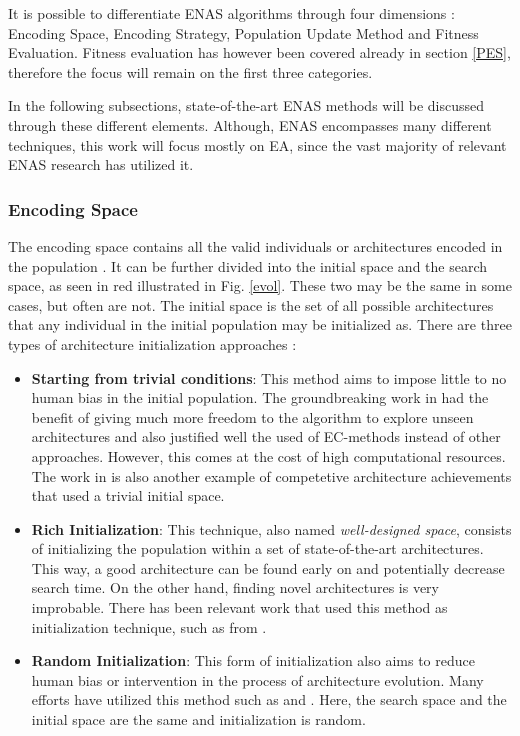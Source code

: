 \documentclass[10pt,        %
               a4paper,     %
               journal,     %
               ]{IEEEtran}
\begin{document}
It is possible to differentiate ENAS algorithms through four dimensions \cite{liu2021survey}:
Encoding Space, Encoding Strategy, Population Update Method and Fitness Evaluation. Fitness evaluation has however been
covered already in section \ref{PES}, therefore the focus will remain on the first three categories.

In the following subsections, state-of-the-art ENAS methods will be discussed through these different elements.
Although, ENAS encompasses many different techniques, this work will focus mostly on EA,
since the vast majority of relevant ENAS research has utilized it.

\subsubsection{Encoding Space}
The encoding space contains all the valid individuals or architectures encoded in the population \cite{liu2021survey}.
It can be further divided into the initial space and the search space, as seen in red illustrated in Fig. \ref{evol}. These two may be the same in some cases,
but often are not. The initial space is the set of all possible architectures that any individual in the initial population may
be initialized as. There are three types of architecture initialization approaches \cite{liu2021survey}:

\begin{itemize}
    \item \textbf{Starting from trivial conditions}: This method aims to impose little to no human bias in the initial
     population. The groundbreaking work in \cite{pmlr-v70-real17a} had the benefit of giving much more freedom to the algorithm
     to explore unseen architectures and also justified well the used of EC-methods instead of other approaches.
     However, this comes at the cost of high computational resources. The work in \cite{xie2017genetic} is
     also another example of competetive architecture achievements that used a trivial initial space.

    \item \textbf{Rich Initialization}: This technique, also named \textit{well-designed space}, consists of initializing
    the population within a set of state-of-the-art architectures. This way, a good architecture can be found early on
    and potentially decrease search time. On the other hand, finding novel architectures is very improbable. There has been
    relevant work that used this method as initialization technique, such as from \cite{fujino2017deep}.

    \item \textbf{Random Initialization}: This form of initialization also aims to reduce human bias or intervention in
     the process of architecture evolution. Many efforts have utilized this method such as \cite{sun2019evolving} and
     \cite{sun2019completely}. Here, the search space and the initial space are the same and initialization is random.
\end{itemize}
\end{document}
